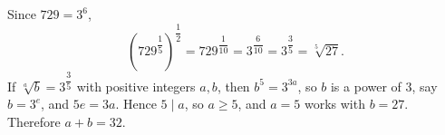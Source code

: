 Since $729=3^6$,
\[\left(729^{\dfrac15}\right)^{\dfrac12}=729^{\dfrac1{10}}=3^{\dfrac6{10}}=3^{\dfrac35}=\sqrt[5]{27}.\]
If $\sqrt[a]{b}=3^{\dfrac35}$ with positive integers $a,b$, then $b^5=3^{3a}$, so $b$ is a power of $3$, say $b=3^e$, and $5e=3a$. Hence $5\mid a$, so $a\ge5$, and $a=5$ works with $b=27$. Therefore $a+b=\boxed{32}$.
